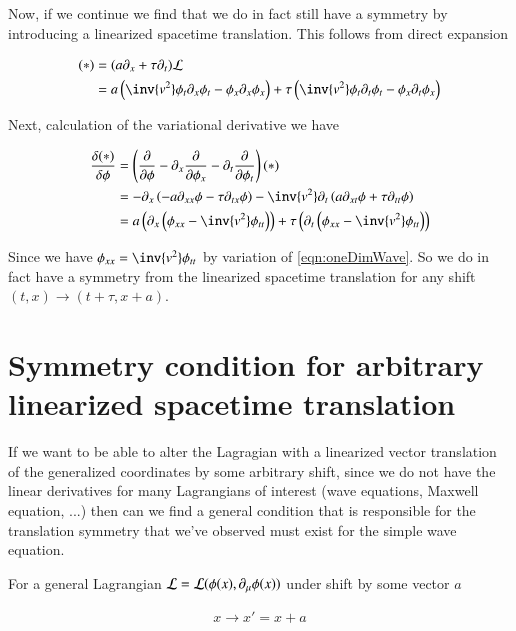 \documentclass{article}
\begin{document}
Now, if we continue we find that we do in fact still have a symmetry by introducing a linearized spacetime translation.
This follows from direct expansion

\begin{align*}
(*) 
&= (a \partial_x + \tau \partial_t) \LL \\
&= 
a 
\left(
\inv{v^2} \phi_t \partial_x \phi_t
- \phi_x \partial_x \phi_x
\right)
+ \tau 
\left(
\inv{v^2} \phi_t \partial_t \phi_t
- \phi_x \partial_t \phi_x
\right) \\
\end{align*}

Next, calculation of the variational derivative we have

\begin{align*}
\frac{\delta(*)}{\delta \phi}
&=
\left( \PD{\phi}{} - \partial_x \PD{\phi_x}{} - \partial_t \PD{\phi_t}{} \right) (*) \\
&=
-\partial_x \left( -a \partial_{xx} \phi - \tau \partial_{tx}\phi \right) 
-\inv{v^2} \partial_t \left( a \partial_{xt} \phi + \tau \partial_{tt}\phi \right) \\
&=
a \left( 
\partial_x \left(
\phi_{xx} - \inv{v^2} \phi_{tt}
\right)
\right)
+ \tau \left( 
\partial_t \left(
\phi_{xx} - \inv{v^2} \phi_{tt}
\right)
\right) \\
\end{align*}

Since we have $\phi_{xx} = \inv{v^2} \phi_{tt}$ by variation of \ref{eqn:oneDimWave}.  So we do in fact have a symmetry from the 
linearized spacetime translation for any shift $(t,x) \rightarrow (t+\tau, x+a)$.

\section{ Symmetry condition for arbitrary linearized spacetime translation }

If we want to be able to alter the Lagragian with a linearized vector translation of the generalized coordinates by some arbitrary 
shift, since we do not have the linear derivatives for many Lagrangians of interest (wave equations, Maxwell equation, ...)
then can we find a general condition that is responsible for the translation symmetry that we've observed must exist for
the simple wave equation.

For a general Lagrangian $\mathcal{L} = \mathcal{L}(\phi(x), \partial_\mu \phi(x))$ under shift by some vector $a$

\begin{align*}
x \rightarrow x' = x + a
\end{align*}
\end{document}
